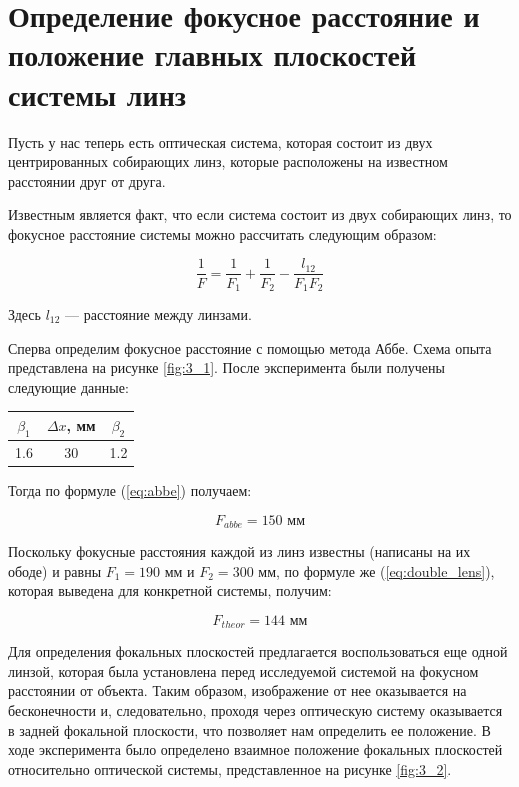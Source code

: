 \documentclass[a4paper, 12pt]{article}
\begin{document}
\section{Определение фокусное расстояние и положение главных плоскостей системы линз}

Пусть у нас теперь есть оптическая система, которая состоит из двух центрированных собирающих линз, которые расположены на известном расстоянии друг от друга. 

Известным является факт, что если система состоит из двух собирающих линз, то фокусное расстояние системы можно рассчитать следующим образом:

\begin{equation}
	\frac{1}{F} = \frac{1}{F_1} + \frac{1}{F_2} - \frac{l_{12}}{F_1 F_2}
	\label{eq:double_lens}
\end{equation}

Здесь $l_{12}$ --- расстояние между линзами.

Сперва определим фокусное расстояние с помощью метода Аббе. Схема опыта представлена на рисунке \ref{fig:3_1}. После эксперимента были получены следующие данные:

\begin{center}
	\begin{tabular}{|c|c|c|}
		\hline
		$\beta_1$ & $\Delta x$, мм & $\beta_2$ \\
		\hline
		1.6 & 30 & 1.2 \\
		\hline
	\end{tabular}
\end{center}

Тогда по формуле (\ref{eq:abbe}) получаем:

\begin{equation*}
	\boxed{F_{abbe} = 150 \text{ мм}}
\end{equation*}

Поскольку фокусные расстояния каждой из линз известны (написаны на их ободе) и равны $F_1 = 190 \text{ мм}$ и $F_2 = 300 \text{ мм}$, по формуле же (\ref{eq:double_lens}), которая выведена для конкретной системы, получим:

\begin{equation*}
	\boxed{F_{theor} = 144 \text{ мм}}
\end{equation*}

Для определения фокальных плоскостей предлагается воспользоваться еще одной линзой, которая была установлена перед исследуемой системой на фокусном расстоянии от объекта. Таким образом, изображение от нее оказывается на бесконечности и, следовательно, проходя через оптическую систему оказывается в задней фокальной плоскости, что позволяет нам определить ее положение. В ходе эксперимента было определено взаимное положение фокальных плоскостей относительно оптической системы, представленное на рисунке \ref{fig:3_2}.
\end{document}
